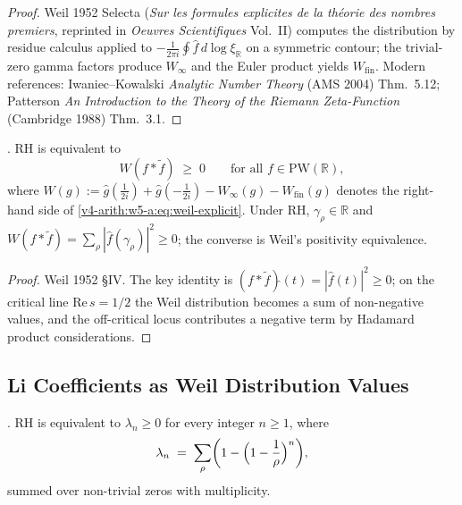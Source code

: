 \begin{proof}
Weil 1952 Selecta (\emph{Sur les formules explicites de la th\'eorie
des nombres premiers}, reprinted in \emph{Oeuvres Scientifiques} Vol.~II)
computes the distribution by residue calculus applied to
\(-\frac{1}{2\pi i}\oint\widehat{f}\,d\log\xi_{\mathbb{R}}\) on a
symmetric contour; the trivial-zero gamma factors produce
\(W_{\infty}\) and the Euler product yields \(W_{\mathrm{fin}}\).
Modern references: Iwaniec--Kowalski \emph{Analytic Number Theory}
(AMS 2004) Thm.~5.12; Patterson \emph{An Introduction to the Theory of
the Riemann Zeta-Function} (Cambridge 1988) Thm.~3.1.
\end{proof}

\begin{corollary}
\label{v4-arith:w5-a:cor:weil-positivity-RH}
\ClaimStatusProvedElsewhere. RH is equivalent to
\begin{equation}
\label{v4-arith:w5-a:eq:weil-positivity}
W(f*\widetilde{f})\;\geq\;0\qquad\text{for all }f\in\mathrm{PW}(\mathbb{R}),
\end{equation}
where \(W(g):=\widehat{g}(\tfrac{1}{2i})+\widehat{g}(-\tfrac{1}{2i})-W_{\infty}(g)-W_{\mathrm{fin}}(g)\)
denotes the right-hand side of \eqref{v4-arith:w5-a:eq:weil-explicit}.
Under RH, \(\gamma_{\rho}\in\mathbb R\) and
\(W(f*\widetilde{f})=\sum_{\rho}|\widehat{f}(\gamma_{\rho})|^{2}\geq 0\);
the converse is Weil's positivity equivalence.
\end{corollary}

\begin{proof}
Weil 1952 \S IV. The key identity is
\((f*\widetilde{f})\widehat{}(t)=|\widehat{f}(t)|^{2}\geq 0\); on the
critical line \(\mathrm{Re}\,s=1/2\) the Weil distribution becomes a
sum of non-negative values, and the off-critical locus contributes a
negative term by Hadamard product considerations.
\end{proof}

\subsection{Li Coefficients as Weil Distribution Values}
\label{v4-arith:w5-a:weil-explicit:Li}

\begin{theorem}
\label{v4-arith:w5-a:thm:li-criterion}
\ClaimStatusProvedElsewhere. RH is equivalent to \(\lambda_{n}\geq 0\)
for every integer \(n\geq 1\), where
\begin{equation}
\label{v4-arith:w5-a:eq:li}
\lambda_{n}\;=\;\sum_{\rho}\biggl(1-\Bigl(1-\frac{1}{\rho}\Bigr)^{n}\biggr),
\end{equation}
summed over non-trivial zeros with multiplicity.
\end{theorem}


